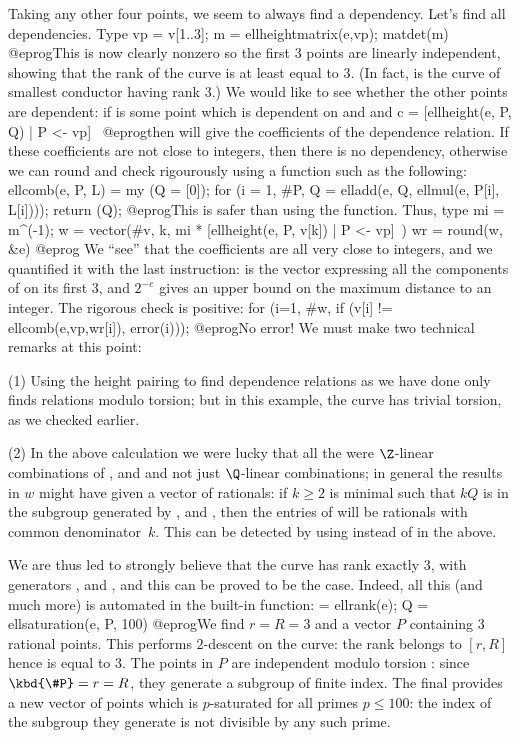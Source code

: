 Taking any other four points, we seem to always find a dependency.
Let's find all dependencies. Type
\bprog
  vp = v[1..3];
  m = ellheightmatrix(e,vp);
  matdet(m)
@eprog\noindent This is now clearly nonzero so the first 3 points are
linearly independent, showing that the rank of the curve is at least equal to
3. (In fact,  is the curve of smallest conductor having rank 3.)
We would like to see whether the other points are dependent:
if  is some point which is dependent on  and 
and
\bprog
  c = [ellheight(e, P, Q) | P <- vp]~
@eprog\noindent then  will give the coefficients of the
dependence relation. If these coefficients are not close to integers,
then there is no dependency, otherwise we can round and check rigourously
using a function such as the following:
\bprog
  ellcomb(e, P, L) =
  { my (Q = [0]);
    for (i = 1, #P, Q = elladd(e, Q, ellmul(e, P[i], L[i])));
    return (Q);
  }
@eprog\noindent This is safer than using the  function. Thus, type
\bprog
  mi = m^(-1);
  w = vector(#v, k, mi * [ellheight(e, P, v[k]) | P <- vp]~)
  wr = round(w, &e)
@eprog\noindent
We ``see'' that the coefficients are all very close to integers, and we
quantified it with the last instruction:  is the vector expressing
all the components of  on its first 3, and $2^{-e}$ gives an upper
bound on the maximum distance to an integer. The rigorous check is positive:
\bprog
  for (i=1, #w, if (v[i] != ellcomb(e,vp,wr[i]), error(i)));
@eprog\noindent No error! We must make two technical remarks at this point:

(1) Using the height pairing to find dependence relations as we
have done only finds relations modulo torsion; but in this example, the curve
has trivial torsion, as we checked earlier.

(2) In the above calculation we
were lucky that all the  were $\Z$-linear combinations of
,  and  and not just $\Q$-linear combinations;
in general the results in $w$ might have given a vector of rationals: if
$k\ge2$ is minimal such that $kQ$ is in the subgroup generated by ,
 and , then the entries of  will be rationals with common denominator~$k$. This can be detected
by using  instead of  in the above.
\smallskip

We are thus led to strongly believe that the curve has rank
exactly 3, with generators ,  and , and this
can be proved to be the case. Indeed, all this (and much more) is automated
in the built-in  function:
\bprog
  [r, R, s, P] = ellrank(e);
  Q = ellsaturation(e, P, 100)
@eprog\noindent We find $r = R = 3$ and a vector $P$ containing $3$
rational points. This performs $2$-descent on the curve: the rank belongs
to $[r,R]$ hence is equal to $3$. The points in $P$ are independent
modulo torsion : since $\kbd{\#P} = r = R$, they generate a subgroup
of finite index. The final  provides a new vector of
points which is $p$-saturated for all primes $p \leq 100$: the index of the
subgroup they generate is not divisible by any such prime.

